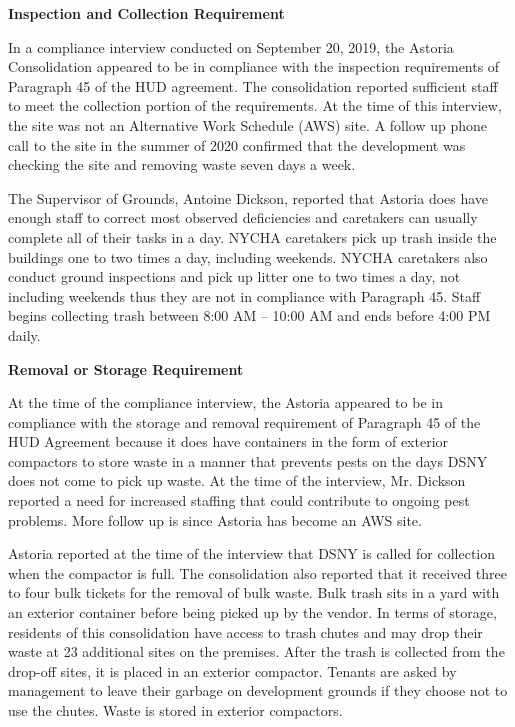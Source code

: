 

\textbf{Inspection and Collection Requirement}

In a compliance interview conducted on September 20, 2019, the Astoria Consolidation appeared to be in compliance with the inspection requirements of Paragraph 45 of the HUD agreement. The consolidation reported sufficient staff to meet the collection portion of the requirements. At the time of this interview, the site was not an Alternative Work Schedule (AWS) site. A follow up phone call to the site in the summer of 2020 confirmed that the development was checking the site and removing waste seven days a week.

The Supervisor of Grounds, Antoine Dickson, reported that Astoria does have enough staff to correct most observed deficiencies and caretakers can usually complete all of their tasks in a day. NYCHA caretakers pick up trash inside the buildings one to two times a day, including weekends. NYCHA caretakers also conduct ground inspections and pick up litter one to two times a day, not including weekends thus they are not in compliance with Paragraph 45. Staff begins collecting trash between 8:00 AM -- 10:00 AM and ends before 4:00 PM daily.

\textbf{Removal or Storage Requirement}

At the time of the compliance interview, the Astoria appeared to be in compliance with the storage and removal requirement of Paragraph 45 of the HUD Agreement because it does have containers in the form of exterior compactors to store waste in a manner that prevents pests on the days DSNY does not come to pick up waste. At the time of the interview, Mr. Dickson reported a need for increased staffing that could contribute to ongoing pest problems. More follow up is since Astoria has become an AWS site.

Astoria reported at the time of the interview that DSNY is called for collection when the compactor is full. The consolidation also reported that it received three to four bulk tickets for the removal of bulk waste. Bulk trash sits in a yard with an exterior container before being picked up by the vendor. In terms of storage, residents of this consolidation have access to trash chutes and may drop their waste at 23 additional sites on the premises. After the trash is collected from the drop-off sites, it is placed in an exterior compactor. Tenants are asked by management to leave their garbage on development grounds if they choose not to use the chutes. Waste is stored in exterior compactors. 

